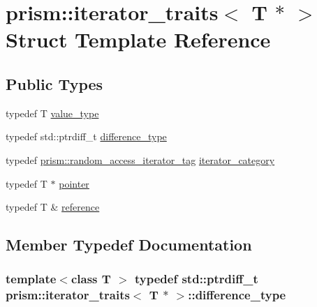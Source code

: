 \hypertarget{structprism_1_1iterator__traits_3_01_t_01_5_01_4}{}\section{prism\+:\+:iterator\+\_\+traits$<$ T $\ast$ $>$ Struct Template Reference}
\label{structprism_1_1iterator__traits_3_01_t_01_5_01_4}
\subsection*{Public Types}
\begin{DoxyCompactItemize}
\item 
typedef T \hyperlink{structprism_1_1iterator__traits_3_01_t_01_5_01_4_aba0237486c133218e1fe55040e667b42}{value\+\_\+type}
\item 
typedef std\+::ptrdiff\+\_\+t \hyperlink{structprism_1_1iterator__traits_3_01_t_01_5_01_4_ae1ff2b10c08886cd34b9e09a73a4a309}{difference\+\_\+type}
\item 
typedef \hyperlink{structprism_1_1random__access__iterator__tag}{prism\+::random\+\_\+access\+\_\+iterator\+\_\+tag} \hyperlink{structprism_1_1iterator__traits_3_01_t_01_5_01_4_a493063ea0c7f896aef5a6979ad6da97c}{iterator\+\_\+category}
\item 
typedef T $\ast$ \hyperlink{structprism_1_1iterator__traits_3_01_t_01_5_01_4_a23fbd7c0b83a23804b00b3d9b77a09c5}{pointer}
\item 
typedef T \& \hyperlink{structprism_1_1iterator__traits_3_01_t_01_5_01_4_add9024b705e4daf7ac40941cb160f786}{reference}
\end{DoxyCompactItemize}


\subsection{Member Typedef Documentation}
\subsubsection[{\texorpdfstring{difference\+\_\+type}{difference_type}}]{\setlength{\rightskip}{0pt plus 5cm}template$<$class T $>$ typedef std\+::ptrdiff\+\_\+t {\bf prism\+::iterator\+\_\+traits}$<$ T $\ast$ $>$\+::{\bf difference\+\_\+type}}\hypertarget{structprism_1_1iterator__traits_3_01_t_01_5_01_4_ae1ff2b10c08886cd34b9e09a73a4a309}{}\label{structprism_1_1iterator__traits_3_01_t_01_5_01_4_ae1ff2b10c08886cd34b9e09a73a4a309}
